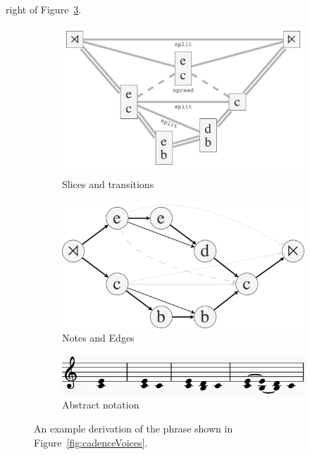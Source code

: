 \documentclass[12pt,a4paper,twoside,openright]{report} \usepackage[pdfborder={0 0 0}]{hyperref}    %
\theoremstyle{definition} \newtheorem{definition}{Definition}[section]
\begin{document}
right of Figure~\ref{fig:cadenceDerivation}. \begin{figure}[h] \centering \begin{subfigure}[t]{.55\textwidth}
  \centering\includegraphics[keepaspectratio,width=\textwidth]{prep/cadenceouterder.png} \caption{Slices and
  transitions} \label{fig:cadenceOuterDer} \end{subfigure} \begin{subfigure}[t]{.42\textwidth}
  \centering\includegraphics[keepaspectratio,width=\textwidth]{prep/cadenceinnerder.png} \caption{Notes and Edges}
  \label{fig:cadenceInnerDer} \end{subfigure} \begin{subfigure}[t]{.8\textwidth}
\centering\includegraphics[keepaspectratio,width=\textwidth]{prep/cadencederivation.png} \caption{Abstract notation}
\label{fig:cadenceDerivation} \end{subfigure}

\captionsetup{width=.9\linewidth} \caption{An example derivation of the phrase shown in Figure~\ref{fig:cadenceVoices}.
} \label{fig:innerOuterStructure} \end{figure}
\end{document}

